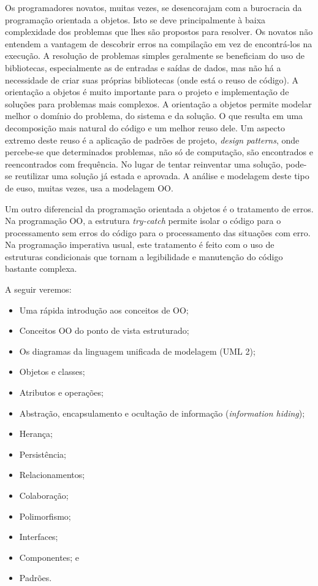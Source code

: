 Os programadores novatos, muitas vezes, se desencorajam com a burocracia da programação orientada a objetos. Isto se deve principalmente à baixa complexidade dos problemas que lhes são propostos para resolver. Os novatos não entendem a vantagem de descobrir erros na compilação em vez de encontrá-los na execução. A resolução de problemas simples geralmente se beneficiam do uso de bibliotecas, especialmente as de entradas e saídas de dados, mas não há a necessidade de criar suas próprias bibliotecas (onde está o reuso de código). A orientação a objetos é muito importante para o projeto e implementação de soluções para problemas mais complexos. A orientação a objetos permite modelar melhor o domínio do problema, do sistema e da solução. O que resulta em uma decomposição mais natural do código e um melhor reuso dele. Um aspecto extremo deste reuso é a aplicação de padrões de projeto, \textit{design patterns}, onde percebe-se que determinados problemas, não só de computação, são encontrados e reencontrados com frequência. No lugar de tentar reinventar uma solução, pode-se reutilizar uma solução já estada e aprovada. A análise e modelagem deste tipo de euso, muitas vezes, usa a modelagem OO.

Um outro diferencial da programação orientada a objetos é o tratamento de erros. Na programação OO, a estrutura \emph{try-catch} permite isolar o código para o processamento sem erros do código para o processamento das situações com erro. Na programação imperativa usual, este tratamento é feito com o uso de estruturas condicionais que tornam a legibilidade e manutenção do código bastante complexa.

A seguir veremos:

\begin{itemize}
\item Uma rápida introdução aos conceitos de OO;
\item Conceitos OO do ponto de vista estruturado;
\item Os diagramas da linguagem unificada de modelagem (UML 2);
\item Objetos e classes;
\item Atributos e operações;
\item Abstração, encapsulamento e ocultação de informação (\textit{information hiding});
\item Herança;
\item Persistência;
\item Relacionamentos;
\item Colaboração;
\item Polimorfismo;
\item Interfaces;
\item Componentes; e
\item Padrões.
\end{itemize}

